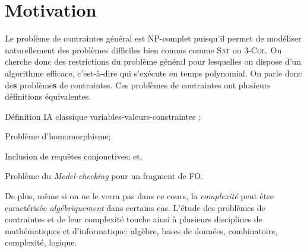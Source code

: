 \documentclass[a4paper,12pt]{article}
\theoremstyle{definition}
\theoremstyle{remark}
\begin{document}
\section{Motivation}
Le problème de contraintes général est NP-complet puisqu'il permet de modéliser naturellement des problèmes difficiles bien connus comme \textsc{Sat} ou $3$-\textsc{Col}. On cherche donc des restrictions du problème général pour lesquelles on dispose d'un algorithme efficace, c'est-à-dire qui s'exécute en temps polynomial. On parle donc de\textbf{s} problème\textbf{s} de contraintes.
Ces problèmes de contraintes ont plusieurs définitions équivalentes.
\begin{compactitem}
\item Définition IA classique \og variables-valeurs-constraintes \fg;
\item Problème d'homomorphisme;
\item Inclusion de requêtes conjonctives; et,
\item Problème du \textsl{Model-checking} pour un fragment de FO\footnotemark{}.
\end{compactitem}
De plus, même si on ne le verra pas dans ce cours, la \emph{complexité} peut être caractérisée \emph{algébriquement} dans certains cas.
L'étude des problèmes de contraintes et de leur complexité touche ainsi à plusieurs disciplines de mathématiques et d'informatique: algèbre, bases de données, combinatoire, complexité, logique.
\end{document}
